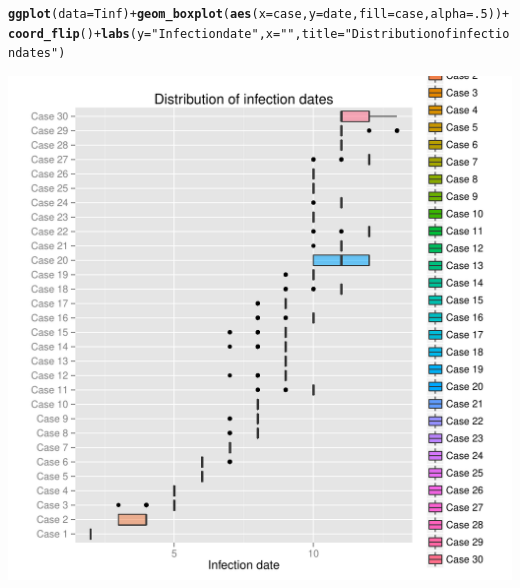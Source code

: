 \documentclass{article}\usepackage[]{graphicx}\usepackage[]{color}
\makeatletter
\newcommand{\hlnum}[1]{\textcolor[rgb]{0.686,0.059,0.569}{#1}}%
\newcommand{\hlstr}[1]{\textcolor[rgb]{0.192,0.494,0.8}{#1}}%
\newcommand{\hlopt}[1]{\textcolor[rgb]{0,0,0}{#1}}%
\newcommand{\hlstd}[1]{\textcolor[rgb]{0.345,0.345,0.345}{#1}}%
\newcommand{\hlkwc}[1]{\textcolor[rgb]{0.333,0.667,0.333}{#1}}%
\newcommand{\hlkwd}[1]{\textcolor[rgb]{0.737,0.353,0.396}{\textbf{#1}}}%
\newenvironment{kframe}{%
 \def\at@end@of@kframe{}%
 \ifinner\ifhmode%
  \def\at@end@of@kframe{\end{minipage}}%
  \begin{minipage}{\columnwidth}%
 \fi\fi%
 \def\FrameCommand##1{\hskip\@totalleftmargin \hskip-\fboxsep
 \colorbox{shadecolor}{##1}\hskip-\fboxsep
     \hskip-\linewidth \hskip-\@totalleftmargin \hskip\columnwidth}%
 \MakeFramed {\advance\hsize-\width
   \@totalleftmargin\z@ \linewidth\hsize
   \@setminipage}}%
 {\par\unskip\endMakeFramed%
 \at@end@of@kframe}
\newenvironment{knitrout}{}{} %
\makeatother
\begin{document}
\begin{knitrout}
\color{fgcolor}\begin{kframe}
\begin{alltt}
\hlkwd{ggplot}\hlstd{(}\hlkwc{data}\hlstd{=Tinf)} \hlopt{+} \hlkwd{geom_boxplot}\hlstd{(}\hlkwd{aes}\hlstd{(}\hlkwc{x}\hlstd{=case,}\hlkwc{y}\hlstd{=date,}\hlkwc{fill}\hlstd{=case,} \hlkwc{alpha}\hlstd{=}\hlnum{.5}\hlstd{))} \hlopt{+}
   \hlkwd{coord_flip}\hlstd{()} \hlopt{+} \hlkwd{labs}\hlstd{(}\hlkwc{y}\hlstd{=}\hlstr{"Infection date"}\hlstd{,} \hlkwc{x}\hlstd{=}\hlstr{""}\hlstd{,} \hlkwc{title}\hlstd{=}\hlstr{"Distribution of infection dates"}\hlstd{)}
\end{alltt}
\end{kframe}

{\centering \includegraphics[width=.6\textwidth]{figs/unnamed-chunk-29} 

}



\end{knitrout}
\end{document}
